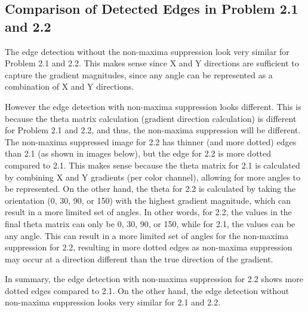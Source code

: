 \documentclass[12pt]{article}
\begin{document}
\subsection{Comparison of Detected Edges in Problem 2.1 and 2.2}
The edge detection without the non-maxima suppression look very similar for Problem 2.1 and 2.2. This makes sense since X and Y directions are sufficient to capture the gradient magnitudes, since any angle can be represented as a combination of X and Y directions. 

However the edge detection with non-maxima suppression looks different. This is because the theta matrix calculation (gradient direction calculation) is different for Problem 2.1 and 2.2, and thus, the non-maxima suppression will be different. The non-maxima suppressed image for 2.2 has thinner (and more dotted) edges than 2.1 (as shown in images below), but the edge for 2.2 is more dotted compared to 2.1. This makes sense because the theta matrix for 2.1 is calculated by combining X and Y gradients (per color channel), allowing for more angles to be represented. On the other hand, the theta for 2.2 is calculated by taking the orientation (0, 30, 90, or 150) with the highest gradient magnitude, which can result in a more limited set of angles. In other words, for 2.2, the values in the final theta matrix can only be 0, 30, 90, or 150, while for 2.1, the values can be any angle. This can result in a more limited set of angles for the non-maxima suppression for 2.2, resulting in more dotted edges as non-maxima suppression may occur at a direction different than the true direction of the gradient.

In summary, the edge detection with non-maxima suppression for 2.2 shows more dotted edges compared to 2.1. On the other hand, the edge detection without non-maxima suppression looks very similar for 2.1 and 2.2.
\end{document}
